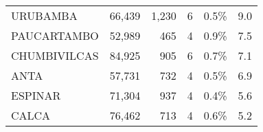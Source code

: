 \begin{tabular}{lrrrrr}
	\cellcolor[HTML]{FFFC9E}URUBAMBA      & 66,439                                                         & 1,230                                                                & 6                                                              & 0.5\%                                                                  & 9.0                                                                                                                                \\
	\cellcolor[HTML]{FFFC9E}PAUCARTAMBO   & 52,989                                                         & 465                                                                  & 4                                                              & 0.9\%                                                                  & 7.5                                                                                                                                \\
	\cellcolor[HTML]{FFFC9E}CHUMBIVILCAS  & 84,925                                                         & 905                                                                  & 6                                                              & 0.7\%                                                                  & 7.1                                                                                                                                \\
	\cellcolor[HTML]{FFFC9E}ANTA          & 57,731                                                         & 732                                                                  & 4                                                              & 0.5\%                                                                  & 6.9                                                                                                                                \\
	\cellcolor[HTML]{FFFC9E}ESPINAR       & 71,304                                                         & 937                                                                  & 4                                                              & 0.4\%                                                                  & 5.6                                                                                                                                \\
	\cellcolor[HTML]{FFFC9E}CALCA         & 76,462                                                         & 713                                                                  & 4                                                              & 0.6\%                                                                  & 5.2                                                                                                                                \\

\end{tabular}

